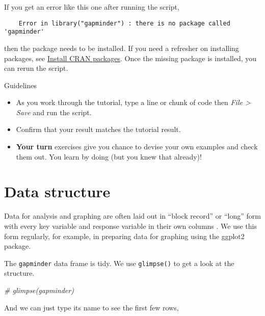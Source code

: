 \documentclass[
]{book}
\newenvironment{Shaded}{\begin{snugshade}}{\end{snugshade}}
\newcommand{\CommentTok}[1]{\textcolor[rgb]{0.56,0.35,0.01}{\textit{#1}}}
\providecommand{\tightlist}{%
  \setlength{\itemsep}{0pt}\setlength{\parskip}{0pt}}
\begin{document}
If you get an error like this one after running the script,

\begin{verbatim}
    Error in library("gapminder") : there is no package called 'gapminder'
\end{verbatim}

then the package needs to be installed. If you need a refresher on installing packages, see \protect\hyperlink{install-cran-packages}{Install CRAN packages}. Once the missing package is installed, you can rerun the script.

Guidelines

\begin{itemize}
\tightlist
\item
  As you work through the tutorial, type a line or chunk of code then \emph{File \textgreater{} Save} and run the script.\\
\item
  Confirm that your result matches the tutorial result.\\
\item
  \textbf{Your turn} exercises give you chance to devise your own examples and check them out. You learn by doing (but you knew that already)!
\end{itemize}

\hypertarget{data-structure}{%
\section{Data structure}\label{data-structure}}

Data for analysis and graphing are often laid out in ``block record'' or ``long'' form with every key variable and response variable in their own columns \citep{Mount+Zumel:2019:fluid-data}. We use this form regularly, for example, in preparing data for graphing using the ggplot2 package.

The \texttt{gapminder} data frame is tidy. We use \texttt{glimpse()} to get a look at the structure.

\begin{Shaded}
\begin{Highlighting}[]
\CommentTok{\# glimpse(gapminder)}
\end{Highlighting}
\end{Shaded}

And we can just type its name to see the first few rows,
\end{document}
